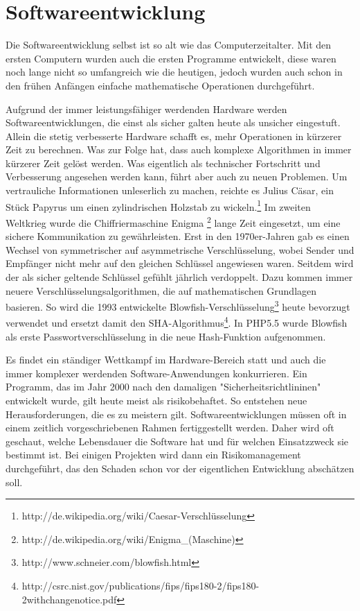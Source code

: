\section{Softwareentwicklung}

Die Softwareentwicklung selbst ist so alt wie das Computerzeitalter. 
Mit den ersten Computern wurden auch die ersten Programme entwickelt,
diese waren noch lange nicht so umfangreich wie die heutigen, jedoch wurden
auch schon in den frühen Anfängen einfache mathematische Operationen durchgeführt. 

Aufgrund der immer leistungsfähiger werdenden Hardware werden Softwareentwicklungen, 
die einst als sicher galten heute als unsicher eingestuft. Allein die stetig 
verbesserte Hardware schafft es, mehr Operationen in kürzerer Zeit zu berechnen.
Was zur Folge hat, dass auch komplexe Algorithmen in immer kürzerer Zeit
gelöst werden. Was eigentlich als technischer Fortschritt und Verbesserung 
angesehen werden kann, führt aber auch zu neuen Problemen.
Um vertrauliche Informationen unleserlich zu machen, reichte es Julius Cäsar, 
ein Stück Papyrus um einen zylindrischen Holzstab zu wickeln.\footnote{http://de.wikipedia.org/wiki/Caesar-Verschlüsselung} 
Im zweiten Weltkrieg wurde die Chiffriermaschine Enigma \footnote{http://de.wikipedia.org/wiki/Enigma_(Maschine)} 
lange Zeit eingesetzt, um eine sichere Kommunikation zu gewährleisten. 
Erst in den 1970er-Jahren gab es einen Wechsel von symmetrischer auf 
asymmetrische Verschlüsselung, wobei Sender und Empfänger nicht mehr auf 
den gleichen Schlüssel angewiesen waren. Seitdem wird der als sicher
geltende Schlüssel gefühlt jährlich verdoppelt. Dazu kommen immer
neuere Verschlüsselungsalgorithmen, die auf mathematischen Grundlagen basieren. 
So wird die 1993 entwickelte Blowfish-Verschlüsselung\footnote{http://www.schneier.com/blowfish.html}
heute bevorzugt verwendet und ersetzt damit den SHA-Algorithmus\footnote{http://csrc.nist.gov/publications/fips/fips180-2/fips180-2withchangenotice.pdf}. 
In PHP5.5 wurde Blowfish als erste Passwortverschlüsselung in die neue
Hash-Funktion aufgenommen.   

Es findet ein ständiger Wettkampf im Hardware-Bereich statt und auch die 
immer komplexer werdenden Software-Anwendungen konkurrieren. Ein Programm, das im Jahr 2000 nach den damaligen "Sicherheitsrichtlininen" 
entwickelt wurde, gilt heute meist als risikobehaftet. So entstehen 
neue Herausforderungen, die es zu meistern gilt. 
Softwareentwicklungen müssen oft in einem zeitlich vorgeschriebenen 
Rahmen fertiggestellt werden. Daher wird oft geschaut, welche Lebensdauer 
die Software hat und für welchen Einsatzzweck sie bestimmt ist. Bei einigen
Projekten wird dann ein Risikomanagement durchgeführt, das den 
Schaden schon vor der eigentlichen Entwicklung abschätzen soll.

